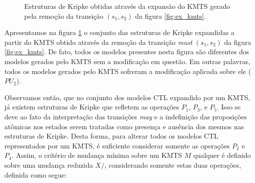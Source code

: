\documentclass[normaltoc,capchap,capsec,times]{abnt}
\begin{document}
\begin{figure}[htb]
\begin{center}
{
}
\end{center}
\centering \caption[Estruturas de Kripke geradas por um KMTS modificado da figura \ref{fig:ex_kmts}]{Estruturas de Kripke obtidas através da expansão do KMTS gerado pela remoção da transição $(s_1,s_2)$ da figura \ref{fig:ex_kmts}.}
\label{fig:revkmts}
\end{figure}

Apresentamos na figura \ref{fig:revkmts} o conjunto das estruturas de Kripke expandidas a partir do KMTS obtido através da remoção da transição \textit{must} $(s_1,s_2)$ da figura \ref{fig:ex_kmts}. De fato, todos os modelos presentes nesta figura são diferentes dos modelos gerados pelo KMTS sem a modificação em questão. Em outras palavras, todos os modelos gerados pelo KMTS sofreram a modificação aplicada sobre ele ($PU_2$).

Observamos então, que no conjunto dos modelos CTL expandido por um KMTS, já existem estruturas de Kripke que refletem as operações $P_1$, $P_3$, e $P_5$. Isso se deve ao fato da interpretação das transições \textit{may} e a indefinição das proposições atômicas nos estados serem tratadas como presença e ausência dos mesmos nas estruturas de Kripke. Desta forma, para alterar todos os modelos CTL representados por um KMTS, é suficiente considerar somente as operações $P_2$ e $P_4$. Assim, o critério de mudança mínima sobre um KMTS $M$ qualquer é definido sobre uma mudança reduzida $X/$, considerando somente estas duas operações, definida como segue:
\end{document}
